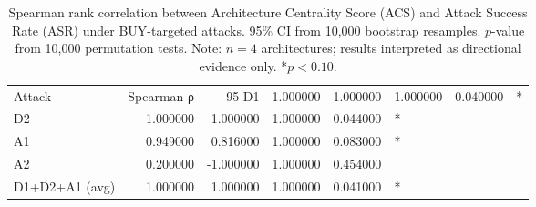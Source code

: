 \begin{table}
\caption{Spearman rank correlation between Architecture Centrality Score (ACS) and Attack Success Rate (ASR) under BUY-targeted attacks. 95\% CI from 10,000 bootstrap resamples. $p$-value from 10,000 permutation tests. Note: $n=4$ architectures; results interpreted as directional evidence only. *$p < 0.10$.}
\label{tab:stats}
\begin{tabular}{lrrrrl}
\toprule
Attack & Spearman ρ & 95%
\midrule
D1 & 1.000000 & 1.000000 & 1.000000 & 0.040000 & * \\
D2 & 1.000000 & 1.000000 & 1.000000 & 0.044000 & * \\
A1 & 0.949000 & 0.816000 & 1.000000 & 0.083000 & * \\
A2 & 0.200000 & -1.000000 & 1.000000 & 0.454000 &  \\
D1+D2+A1 (avg) & 1.000000 & 1.000000 & 1.000000 & 0.041000 & * \\
\bottomrule
\end{tabular}
\end{table}
